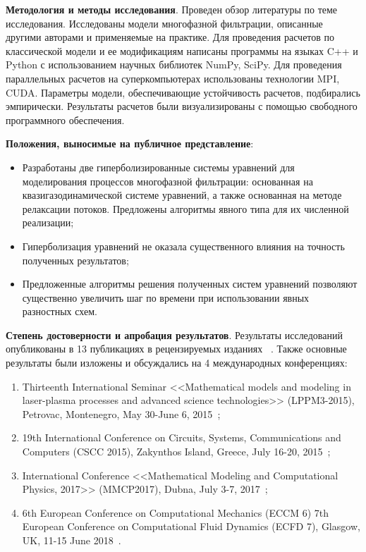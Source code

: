 \textbf{Методология и методы исследования}. Проведен обзор литературы по теме исследования. Исследованы модели многофазной фильтрации, описанные другими авторами и применяемые на практике.
Для проведения расчетов по классической модели и ее модификациям написаны программы на языках C++ и Python с использованием научных библиотек NumPy, SciPy. Для проведения параллельных расчетов на суперкомпьютерах использованы технологии MPI, CUDA.
Параметры модели, обеспечивающие устойчивость расчетов, подбирались эмпирически.
Результаты расчетов были визуализированы с помощью свободного программного обеспечения.

\textbf{Положения, выносимые на публичное представление}:
\begin{itemize}
 \item Разработаны две гиперболизированные системы уравнений для моделирования процессов многофазной фильтрации: основанная на квазигазодинамической системе уравнений, а также основанная на методе релаксации потоков. Предложены алгоритмы явного типа для их численной реализации;
 \item Гиперболизация уравнений не оказала существенного влияния на точность полученных результатов;
 \item Предложенные алгоритмы решения полученных систем уравнений позволяют существенно увеличить шаг по времени при использовании явных разностных схем.
\end{itemize}

\textbf{Степень достоверности и апробация результатов}. Результаты исследований опубликованы в 13 публикациях в рецензируемых изданиях
~\citeauthor{matmod2014, matmod2015, preprint12016, preprint22016, preprint12018, preprint22018, simul2014, modelling2016, problems2018, proc13th, proc19th, proc2017, proc2018}. Также основные результаты были изложены и обсуждались на 4 международных конференциях:
\begin{enumerate}
 \item Thirteenth International Seminar <<Mathematical models and modeling in laser-plasma processes and advanced science technologies>> (LPPM3-2015), Petrovac, Montenegro, May 30-June 6, 2015~\citeauthor{proc13th};
 \item 19th International Conference on Circuits, Systems, Communications and Computers (CSCC 2015), Zakynthos Island, Greece, July 16-20, 2015~\citeauthor{proc19th};
 \item International Conference <<Mathematical Modeling and Computational Physics, 2017>> (MMCP2017), Dubna, July 3-7, 2017~\citeauthor{proc2017};
 \item 6th European Conference on Computational Mechanics (ECCM 6) 7th European Conference on Computational Fluid Dynamics (ECFD 7), Glasgow, UK, 11-15 June 2018~\citeauthor{proc2018}.
\end{enumerate}
 
